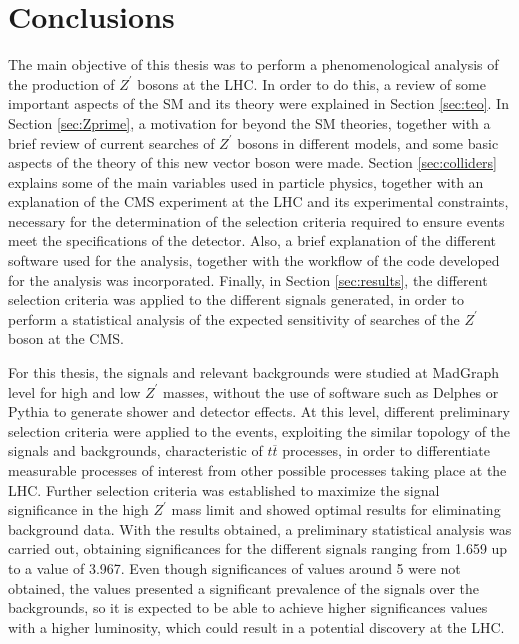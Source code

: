 \clearpage
\vspace{1cm}
\section{Conclusions} \label{sec:conclusions}
\vspace{1cm}

The main objective of this thesis was to perform a phenomenological analysis of the production of $Z^{\prime}$ bosons at the LHC. In order to do this, a review of some important aspects of the SM and its theory were explained in Section \ref{sec:teo}. In Section \ref{sec:Zprime}, a motivation for beyond the SM theories, together with a brief review of current searches of $Z^{\prime}$ bosons in different models, and some basic aspects of the theory of this new vector boson were made. Section \ref{sec:colliders} explains some of the main variables used in particle physics, together with an explanation of the CMS experiment at the LHC and its experimental constraints, necessary for the determination of the selection criteria required to ensure events meet the specifications of the detector. Also, a brief explanation of the different software used for the analysis, together with the workflow of the code developed for the analysis was incorporated. Finally, in Section \ref{sec:results}, the different selection criteria was applied to the different signals generated, in order to perform a statistical analysis of the expected sensitivity of searches of the $Z^{\prime}$ boson at the CMS.

For this thesis, the signals and relevant backgrounds were studied at MadGraph level for high and low $Z^{\prime}$ masses, without the use of software such as Delphes or Pythia to generate shower and detector effects. At this level, different preliminary selection criteria were applied to the events, exploiting the similar topology of the signals and backgrounds, characteristic of $t\overline t$ processes, in order to differentiate measurable processes of interest from other possible processes taking place at the LHC. Further selection criteria was established to maximize the signal significance in the high $Z^{\prime}$ mass limit and showed optimal results for eliminating background data. With the results obtained, a preliminary statistical analysis was carried out, obtaining significances for the different signals ranging from 1.659 up to a value of 3.967. Even though significances of values around 5 were not obtained, the values presented a significant prevalence of the signals over the backgrounds, so it is expected to be able to achieve higher significances values with a higher luminosity, which could result in a potential discovery at the LHC.

